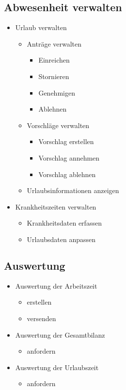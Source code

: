 \subsection*{Abwesenheit verwalten}
\begin{itemize}
\item Urlaub verwalten
\begin{itemize}
\item Anträge verwalten
\begin{itemize}
\item Einreichen
\item Stornieren
\item Genehmigen
\item Ablehnen
\end{itemize}
\item Vorschläge verwalten
\begin{itemize}
\item Vorschlag erstellen
\item Vorschlag annehmen
\item Vorschlag ablehnen
\end{itemize}
\item Urlaubsinformationen anzeigen %
\end{itemize}
\item Krankheitszeiten verwalten
\begin{itemize}
\item Krankheitsdaten erfassen 
\item Urlaubsdaten anpassen
\end{itemize}
\end{itemize}
\subsection*{Auswertung}
\begin{itemize}
\item Auswertung der Arbeitszeit
\begin{itemize}
\item erstellen
\item versenden
\end{itemize}
\item Auswertung der Gesamtbilanz
\begin{itemize}
\item anfordern
\end{itemize}
\item Auswertung der Urlaubszeit
\begin{itemize}
\item anfordern
\end{itemize}
\end{itemize}

